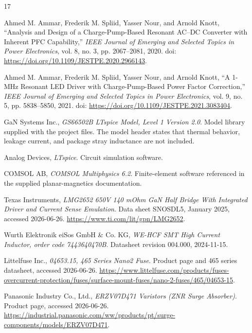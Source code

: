 \begin{thebibliography}{17}
\small
\setlength{\itemsep}{1pt}
\setlength{\parsep}{0pt}
\setlength{\parskip}{0pt}

Ahmed M. Ammar, Frederik M. Spliid, Yasser Nour, and Arnold Knott,
``Analysis and Design of a Charge-Pump-Based Resonant AC--DC Converter with Inherent PFC Capability,''
\emph{IEEE Journal of Emerging and Selected Topics in Power Electronics},
vol. 8, no. 3, pp. 2067--2081, 2020.
doi: \url{https://doi.org/10.1109/JESTPE.2020.2966143}.

Ahmed M. Ammar, Frederik M. Spliid, Yasser Nour, and Arnold Knott,
``A 1-MHz Resonant LED Driver with Charge-Pump-Based Power Factor Correction,''
\emph{IEEE Journal of Emerging and Selected Topics in Power Electronics},
vol. 9, no. 5, pp. 5838--5850, 2021.
doi: \url{https://doi.org/10.1109/JESTPE.2021.3083404}.

GaN Systems Inc.,
\emph{GS66502B LTspice Model, Level 1 Version 2.0}.
Model library supplied with the project files.
The model header states that thermal behavior, leakage current, and package stray inductance are not included.

Analog Devices,
\emph{LTspice}.
Circuit simulation software.

COMSOL AB,
\emph{COMSOL Multiphysics 6.2}.
Finite-element software referenced in the supplied planar-magnetics documentation.

Texas Instruments,
\emph{LMG2652 650V 140 mOhm GaN Half Bridge With Integrated Driver and Current Sense Emulation}.
Data sheet SNOSDL5, January 2025, accessed 2026-06-26.
\url{https://www.ti.com/lit/gpn/LMG2652}.

Wurth Elektronik eiSos GmbH \& Co. KG,
\emph{WE-HCF SMT High Current Inductor, order code 7443640470B}.
Datasheet revision 004.000, 2024-11-15.

Littelfuse Inc.,
\emph{04653.15, 465 Series Nano2 Fuse}.
Product page and 465 series datasheet, accessed 2026-06-26.
\url{https://www.littelfuse.com/products/fuses-overcurrent-protection/fuses/surface-mount-fuses/nano-2-fuses/465/04653-15}.

Panasonic Industry Co., Ltd.,
\emph{ERZV07D471 Varistors (ZNR Surge Absorber)}.
Product page, accessed 2026-06-26.
\url{https://industrial.panasonic.com/ww/products/pt/surge-components/models/ERZV07D471}.


\end{thebibliography}
